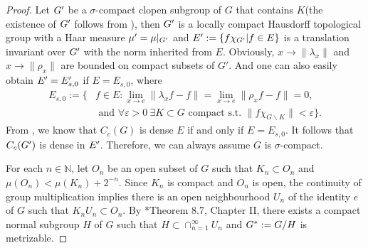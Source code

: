 \begin{proof} 
	Let $G'$ be a $\sigma$-compact clopen subgroup of $G$ that contains $K$(the existence of $G'$ follows from \cite[Theorem A and Theorem B, Section 57]{Measure_Theory}), then $G'$ is a locally compact Hausdorff topological group with a Haar measure $\mu'=\mu|_{G'}$ and $E':=\{f\chi_{G'}|f\in E\}$ is a translation invariant \bfs over $G'$ with the norm inherited from $E$. Obviously,  $x\to \|\lambda_x\|$ and $x\to \|\rho_x\|$  are bounded on compact subsets of $G'$. And one can also easily obtain $E'=E'_{s,0}$ if $E=E_{s,0}$,   where
	\begin{align*}E_{s,0}:=\{ & f\in E:\lim\limits_{x\to e}\|\lambda_x f-f\|=\lim\limits_{x\to e}\|\rho_x f-f\|=0,\\ &\text{ and }\forall \varepsilon>0 ~ \exists K\subset G \text{ compact s.t. }\|f\chi_{G\backslash K}\|<\varepsilon\}.
	\end{align*} From \cite[Theorem 5.4]{David}, we know that $C_c(G)$ is dense $E$ if and only if $E=E_{s,0}$.
	 It follows that $C_c(G')$ is dense in $E'$. 
	 Therefore, we can always assume $G$ is $\sigma$-compact.

For each $n\in \mathbb{N}$, let $O_n$ be an open subset of $G$ such that $K_n\subset O_n$ and $\mu(O_n)<\mu(K_n)+2^{-n}$. Since $K_n$ is compact and $O_n$ is open, the continuity of group multiplication implies there is an open neighbourhood $U_n$ of the identity $e$ of $G$ such that $K_nU_n\subset O_n$. By \cite{Measure_Theory}*{Theorem 8.7, Chapter II},    there exists a compact normal subgroup $H$ of $G$ such that $H\subset \cap_{n=1}^\infty U_n$ and $G^*:=G/H$ is metrizable. 


\end{proof}
